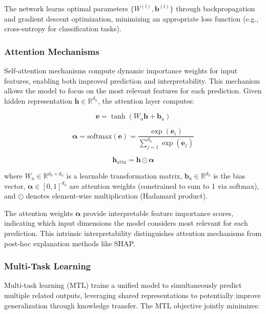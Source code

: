 The network learns optimal parameters $\{W^{(l)}, \mathbf{b}^{(l)}\}$ through backpropagation and gradient descent optimization, minimizing an appropriate loss function (e.g., cross-entropy for classification tasks).

\subsubsection{Attention Mechanisms}

Self-attention mechanisms compute dynamic importance weights for input features, enabling both improved prediction and interpretability. This mechanism allows the model to focus on the most relevant features for each prediction. Given hidden representation $\mathbf{h} \in \mathbb{R}^{d_h}$, the attention layer computes:

\begin{equation}
\mathbf{e} = \tanh\left(W_a\mathbf{h} + \mathbf{b}_a\right)
\end{equation}

\begin{equation}
\boldsymbol{\alpha} = \text{softmax}(\mathbf{e}) = \frac{\exp(\mathbf{e}_i)}{\sum_{j=1}^{d_h} \exp(\mathbf{e}_j)}
\end{equation}

\begin{equation}
\mathbf{h}_{\text{attn}} = \mathbf{h} \odot \boldsymbol{\alpha}
\end{equation}

where $W_a \in \mathbb{R}^{d_h \times d_h}$ is a learnable transformation matrix, $\mathbf{b}_a \in \mathbb{R}^{d_h}$ is the bias vector, $\boldsymbol{\alpha} \in [0,1]^{d_h}$ are attention weights (constrained to sum to 1 via softmax), and $\odot$ denotes element-wise multiplication (Hadamard product).

The attention weights $\boldsymbol{\alpha}$ provide interpretable feature importance scores, indicating which input dimensions the model considers most relevant for each prediction. This intrinsic interpretability distinguishes attention mechanisms from post-hoc explanation methods like SHAP.

\subsubsection{Multi-Task Learning}

Multi-task learning (MTL) trains a unified model to simultaneously predict multiple related outputs, leveraging shared representations to potentially improve generalization through knowledge transfer. The MTL objective jointly minimizes:

